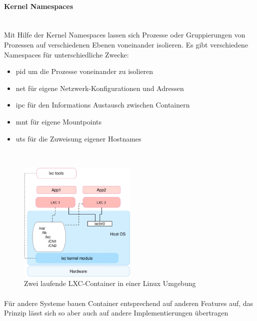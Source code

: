 \paragraph{Kernel Namespaces } \mbox{} \\
\noindent Mit Hilfe der Kernel Namespaces lassen sich Prozesse oder Gruppierungen von Prozessen auf verschiedenen Ebenen voneinander isolieren. Es gibt verschiedene Namespaces für unterschiedliche Zwecke:
\begin{itemize}
  \item pid um die Prozesse voneinander zu isolieren \cite{lnpid}
  \item net für eigene Netzwerk-Konfigurationen und Adressen \cite{lnnet}
  \item ipc für den Informations Austausch zwischen Containern \cite{lnipc}
  \item mnt für eigene Mountpoints \cite{lnns}
  \item uts für die Zuweisung eigener Hostnames \cite{lnuts}
\end{itemize}
\\

\begin{figure}[!ht]
  \centering
  \includegraphics[width=0.5\textwidth]{images/3-containers.jpg}
  \caption{Zwei laufende LXC-Container in einer Linux Umgebung \cite{6903537}}
\end{figure}

\paragraph{}
\noindent Für andere Systeme bauen Container entsprechend auf anderen Features auf, das Prinzip lässt sich so aber auch auf andere Implementierungen übertragen

